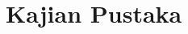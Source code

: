 \documentclass[../main.tex]{subfiles}
\begin{document}
\section{Kajian Pustaka}

\lipsum[1-5]
\end{document}
